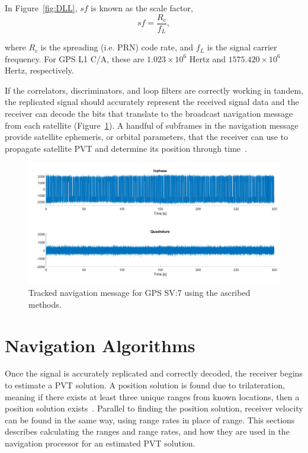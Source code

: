 In Figure~\ref{fig:DLL}, \(sf\) is known as the scale factor,
\begin{equation}\label{eq:sf}
    sf = \frac{R_c}{f_L},
\end{equation}

where \(R_c\) is the spreading (i.e. PRN) code rate, and \(f_L\) is the signal carrier frequency. For GPS L1 C/A, these are \(1.023 \times 10^6\) Hertz and \(1575.420 \times 10^6\) Hertz, respectively.

If the correlators, discriminators, and loop filters are correctly working in tandem, the replicated signal should accurately represent the received signal data and the receiver can decode the bits that translate to the broadcast navigation message from each satellite (Figure~\ref{fig:trk}). A handful of subframes in the navigation message provide satellite ephemeris, or orbital parameters, that the receiver can use to propagate satellite PVT and determine its position through time~\cite{valladoSGP4OrbitDetermination2008}.

\begin{figure}[!ht]
\centering
\includegraphics[width=\linewidth]{Figures/trackingfr.png}
\caption{Tracked navigation message for GPS SV:7 using the ascribed methods.}\label{fig:trk}
\end{figure}

\section{\textbf{Navigation Algorithms}}
Once the signal is accurately replicated and correctly decoded, the receiver begins to estimate a PVT solution. A position solution is found due to trilateration, meaning if there exists at least three unique ranges from known locations, then a position solution exists~\cite{subiranaGNSSDATAPROCESSING}. Parallel to finding the position solution, receiver velocity can be found in the same way, using range rates in place of range. This sections describes calculating the ranges and range rates, and how they are used in the navigation processor for an estimated PVT solution.

